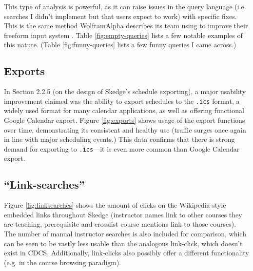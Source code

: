   This type of analysis is powerful, as it can raise issues in the query language (i.e. searches I didn't implement but that users expect to work) with specific fixes. This is the same method WolframAlpha describes its team using to improve their freeform input system \cite{wolfram2}. Table \ref{fig:empty-queries} lists a few notable examples of this nature. (Table \ref{fig:funny-queries} lists a few funny queries I came across.)

\subsection{Exports}

In Section 2.2.5 (on the design of Skedge's schedule exporting), a major usability improvement claimed was the ability to export schedules to the {\tt .ics} format, a widely used format for many calendar applications, as well as offering functional Google Calendar export. Figure \ref{fig:exports} shows usage of the export functions over time, demonstrating its consistent and healthy use (traffic surges once again in line with major scheduling events.) This data confirms that there is strong demand for exporting to {\tt .ics}---it is even more common than Google Calendar export.

\subsection{``Link-searches''}

Figure \ref{fig:linksearches} shows the amount of clicks on the Wikipedia-style embedded links throughout Skedge (instructor names link to other courses they are teaching, prerequisite and crosslist course mentions link to those courses). The number of manual instructor searches is also included for comparison, which can be seen to be vastly less usable than the analogous link-click, which doesn't exist in CDCS. Additionally, link-clicks also possibly offer a different functionality (e.g. in the course browsing paradigm).


